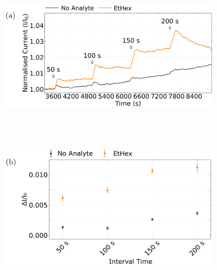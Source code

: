 \documentclass[
  a4paper,
]{scrbook}
\begin{document}
\begin{figure}

\begin{minipage}[t]{0.15\linewidth}

{\centering 

~

}

\end{minipage}%
%
\begin{minipage}[t]{0.70\linewidth}

{\centering 

\includegraphics{figures/ch6/Q2C6_Q3C2_detrend_trunc_arrows_normalised_edited.png}
{}

}

\end{minipage}%
%
\begin{minipage}[t]{0.15\linewidth}

{\centering 

~

}

\end{minipage}%
\newline
\begin{minipage}[t]{0.15\linewidth}

{\centering 

~

}

\end{minipage}%
%
\begin{minipage}[t]{0.70\linewidth}

{\centering 

\includegraphics{figures/ch6/Q2C6_Q3C2_mean_simple_difference_before_and_after_edited.png}
{}

}
\end{minipage}
\end{figure}
\end{document}
